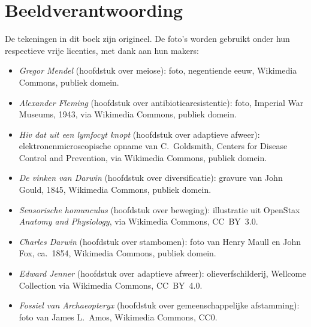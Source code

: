 \chapter*{Beeldverantwoording}

\begingroup\sloppy

De tekeningen in dit boek zijn origineel. De foto's worden gebruikt
onder hun respectieve vrije licenties, met dank aan hun makers:

\begin{itemize}
  \item \emph{Gregor Mendel} (hoofdstuk over meiose): foto,
        negentiende eeuw, Wikimedia Commons, publiek domein.
  \item \emph{Alexander Fleming} (hoofdstuk over
        antibioticaresistentie): foto, Imperial War Museums, 1943, via
        Wikimedia Commons, publiek domein.
  \item \emph{Hiv dat uit een lymfocyt knopt} (hoofdstuk over
        adaptieve afweer): elektronenmicroscopische opname van
        C.~Goldsmith, Centers for Disease Control and Prevention, via
        Wikimedia Commons, publiek domein.
  \item \emph{De vinken van Darwin} (hoofdstuk over diversificatie):
        gravure van John Gould, 1845, Wikimedia Commons, publiek
        domein.
  \item \emph{Sensorische homunculus} (hoofdstuk over beweging):
        illustratie uit OpenStax \emph{Anatomy and Physiology}, via
        Wikimedia Commons, CC~BY~3.0.
  \item \emph{Charles Darwin} (hoofdstuk over stambomen): foto van
        Henry Maull en John Fox, ca.~1854, Wikimedia Commons, publiek
        domein.
  \item \emph{Edward Jenner} (hoofdstuk over adaptieve afweer):
        olieverfschilderij, Wellcome Collection via Wikimedia Commons,
        CC~BY~4.0.
  \item \emph{Fossiel van Archaeopteryx} (hoofdstuk over gemeenschappelijke
        afstamming): foto van James L.~Amos, Wikimedia Commons, CC0.
\end{itemize}

